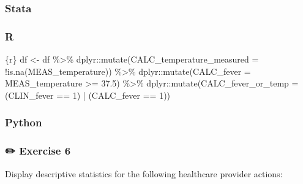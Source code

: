 \documentclass[
  letterpaper,
  DIV=11,
  numbers=noendperiod,
  oneside]{scrreprt}
\newenvironment{Shaded}{\begin{snugshade}}{\end{snugshade}}
\newcommand{\AttributeTok}[1]{\textcolor[rgb]{0.40,0.45,0.13}{#1}}
\newcommand{\DecValTok}[1]{\textcolor[rgb]{0.68,0.00,0.00}{#1}}
\newcommand{\FloatTok}[1]{\textcolor[rgb]{0.68,0.00,0.00}{#1}}
\newcommand{\FunctionTok}[1]{\textcolor[rgb]{0.28,0.35,0.67}{#1}}
\newcommand{\InformationTok}[1]{\textcolor[rgb]{0.37,0.37,0.37}{#1}}
\newcommand{\NormalTok}[1]{\textcolor[rgb]{0.00,0.23,0.31}{#1}}
\newcommand{\OtherTok}[1]{\textcolor[rgb]{0.00,0.23,0.31}{#1}}
\newcommand{\SpecialCharTok}[1]{\textcolor[rgb]{0.37,0.37,0.37}{#1}}
\begin{document}
\hypertarget{stata-9}{%
\subsubsection{Stata}\label{stata-9}}

\hypertarget{r-9}{%
\subsubsection{R}\label{r-9}}

\begin{Shaded}
\begin{Highlighting}[]
\InformationTok{\textasciigrave{}\textasciigrave{}\textasciigrave{}\{r\}}
\NormalTok{df }\OtherTok{\textless{}{-}}\NormalTok{ df }\SpecialCharTok{\%\textgreater{}\%}
\NormalTok{  dplyr}\SpecialCharTok{::}\FunctionTok{mutate}\NormalTok{(}\AttributeTok{CALC\_temperature\_measured =} \SpecialCharTok{!}\FunctionTok{is.na}\NormalTok{(MEAS\_temperature)) }\SpecialCharTok{\%\textgreater{}\%}
\NormalTok{  dplyr}\SpecialCharTok{::}\FunctionTok{mutate}\NormalTok{(}\AttributeTok{CALC\_fever =}\NormalTok{ MEAS\_temperature }\SpecialCharTok{\textgreater{}=} \FloatTok{37.5}\NormalTok{) }\SpecialCharTok{\%\textgreater{}\%}
\NormalTok{  dplyr}\SpecialCharTok{::}\FunctionTok{mutate}\NormalTok{(}\AttributeTok{CALC\_fever\_or\_temp =}\NormalTok{ (CLIN\_fever }\SpecialCharTok{==} \DecValTok{1}\NormalTok{) }\SpecialCharTok{|}\NormalTok{ (CALC\_fever }\SpecialCharTok{==} \DecValTok{1}\NormalTok{))}
\InformationTok{\textasciigrave{}\textasciigrave{}\textasciigrave{}}
\end{Highlighting}
\end{Shaded}

\hypertarget{python-5}{%
\subsubsection{Python}\label{python-5}}

\hypertarget{exercise-6}{%
\subsubsection{\texorpdfstring{{✏️} Exercise
6}{✏️ Exercise 6}}\label{exercise-6}}

Display descriptive statistics for the following healthcare provider
actions:
\end{document}
